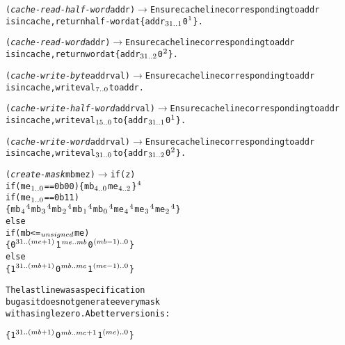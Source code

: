 \begin{alltt}
({\em{cache-read-half-word}} addr)      \(\longrightarrow\)   \textrm{Ensure cache line corresponding to} addr
                             \hspace{.25mm}          \textrm{is in cache, return half-word at} \{ addr\(\sb{31..1}\) 0\(\sp{1}\) \}.

({\em{cache-read-word}} addr)           \(\longrightarrow\)   \textrm{Ensure cache line corresponding to} addr
                             \hspace{.25mm}          \textrm{is in cache, return word at} \{ addr\(\sb{31..2}\) 0\(\sp{2}\) \}.

({\em{cache-write-byte}} addr val)      \(\longrightarrow\)   \textrm{Ensure cache line corresponding to} addr
                             \hspace{.25mm}          \textrm{is in cache, write} val\(\sb{7..0}\) \textrm{to} addr.

({\em{cache-write-half-word}} addr val) \(\longrightarrow\)   \textrm{Ensure cache line corresponding to} addr
                             \hspace{.25mm}          \textrm{is in cache, write} val\(\sb{15..0}\) \textrm{to} \{ addr\(\sb{31..1}\) 0\(\sp{1}\) \}.

({\em{cache-write-word}} addr val)      \(\longrightarrow\)   \textrm{Ensure cache line corresponding to} addr
                             \hspace{.25mm}          \textrm{is in cache, write} val\(\sb{31..0}\) \textrm{to} \{ addr\(\sb{31..2}\) 0\(\sp{2}\) \}.

({\em{create-mask}} mb me z)            \(\longrightarrow\)   if (z)
                                         if (me\(\sb{1..0}\) == 0b00) \{ mb\(\sb{4..0}\) me\(\sb{4..2}\) \}\(\sp{4}\)
                                         if (me\(\sb{1..0}\) == 0b11)
                                            \{ mb\(\sb{4}\)\(\sp{4}\) mb\(\sb{3}\)\(\sp{4}\) mb\(\sb{2}\)\(\sp{4}\) mb\(\sb{1}\)\(\sp{4}\) mb\(\sb{0}\)\(\sp{4}\) me\(\sb{4}\)\(\sp{4}\) me\(\sb{3}\)\(\sp{4}\) me\(\sb{2}\)\(\sp{4}\) \}
                                       else
                                         if (mb <=\(\sb{unsigned}\) me)
                                            \{ 0\(\sp{31..(me+1)}\) 1\(\sp{me..mb}\) 0\(\sp{(mb-1)..0}\) \}
                                         else
                                            \{ 1\(\sp{31..(mb+1)}\) 0\(\sp{mb..me}\) 1\(\sp{(me-1)..0}\) \}

                                       \textrm{The last line was a specification}
                                       \textrm{bug as it does not generate every mask}
                                       \textrm{with a single zero. A better version is:}

                                            \{ 1\(\sp{31..(mb+1)}\) 0\(\sp{mb..me+1}\) 1\(\sp{(me)..0}\) \}
\end{alltt}

